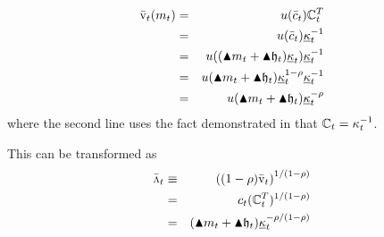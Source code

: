 \begin{eqnarray}
  \bar{\vFunc}_{t}({m}_{t}) & = & \util(\bar{\cRat}_{t})\mathbb{C}_{t}^{T}\label{eq:vFuncPF}
  \\ & = & \util(\bar{c}_{t}) \MinMPC_{t}^{-1} %
  \\ & = & \util((\aboveMin \mRat_{t}+\aboveMin \hEnd_{t})\MinMPC_{t}) \MinMPC_{t}^{-1} %
  \\ & = & \util(\aboveMin \mRat_{t}+\aboveMin \hEnd_{t})\MinMPC_{t}^{1-\CRRA} \MinMPC_{t}^{-1} %
  \\ & = & \util(\aboveMin \mRat_{t}+\aboveMin \hEnd_{t})\MinMPC_{t}^{-\CRRA}  %
\end{eqnarray}
where the second line uses the fact demonstrated in \cite{BufferStockTheory} that $\mathbb{C}_{t}=\kappa^{-1}_{t}$. %

This can be transformed as
\begin{eqnarray*}
  \bar{\vInv}_{t} & \equiv & \left((1-\CRRA)\bar{\vFunc}_{t}\right)^{1/(1-\CRRA)}
\\ & = & \cRat_{t}(\mathbb{C}_{t}^{T})^{1/(1-\CRRA)}
\\ & = & (\aboveMin \mRat_{t}+\aboveMin \hEnd_{t})\MinMPC_{t}^{-\CRRA/(1-\CRRA)}   %
\end{eqnarray*}
